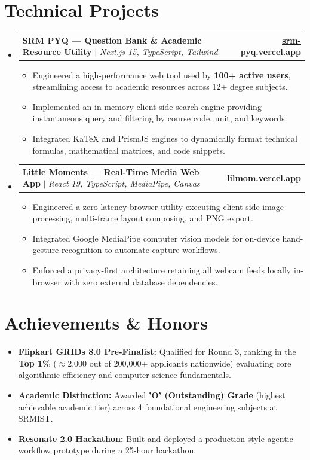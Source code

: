 \documentclass[letterpaper,10pt]{article}
\makeatletter
\newcommand{\resumeItem}[1]{
  \item\small{
    {#1 \vspace{-2pt}}
  }
}
\newcommand{\resumeProjectHeading}[2]{
    \item
    \begin{tabular*}{1.0\textwidth}[t]{l@{\extracolsep{\fill}}r}
      \small#1 & \textbf{\small #2}\\
    \end{tabular*}\vspace{-4pt}
}
\newcommand{\resumeSubHeadingListStart}{\begin{itemize}[leftmargin=0.0in, label={}]}
\newcommand{\resumeSubHeadingListEnd}{\end{itemize}}
\newcommand{\resumeItemListStart}{\begin{itemize}[leftmargin=0.15in, label=\raisebox{0.15ex}{\tiny$\bullet$}, itemsep=1.5pt]}
\newcommand{\resumeItemListEnd}{\end{itemize}\vspace{-3pt}}
\makeatother
\begin{document}
\section{Technical Projects}
    \resumeSubHeadingListStart
      \resumeProjectHeading
          {\textbf{SRM PYQ --- Question Bank \& Academic Resource Utility} $|$ \emph{Next.js 15, TypeScript, Tailwind}}{\href{https://srm-pyq.vercel.app/}{\underline{srm-pyq.vercel.app}}}
          \resumeItemListStart
            \resumeItem{Engineered a high-performance web tool used by \textbf{100+ active users}, streamlining access to academic resources across 12+ degree subjects.}
            \resumeItem{Implemented an in-memory client-side search engine providing instantaneous query and filtering by course code, unit, and keywords.}
            \resumeItem{Integrated KaTeX and PrismJS engines to dynamically format technical formulas, mathematical matrices, and code snippets.}
          \resumeItemListEnd

      \resumeProjectHeading
          {\textbf{Little Moments --- Real-Time Media Web App} $|$ \emph{React 19, TypeScript, MediaPipe, Canvas}}{\href{https://lilmom.vercel.app/}{\underline{lilmom.vercel.app}}}
          \resumeItemListStart
            \resumeItem{Engineered a zero-latency browser utility executing client-side image processing, multi-frame layout composing, and PNG export.}
            \resumeItem{Integrated Google MediaPipe computer vision models for on-device hand-gesture recognition to automate capture workflows.}
            \resumeItem{Enforced a privacy-first architecture retaining all webcam feeds locally in-browser with zero external database dependencies.}
          \resumeItemListEnd
    \resumeSubHeadingListEnd

\section{Achievements \& Honors}
    \resumeSubHeadingListStart
        \resumeItemListStart
            \resumeItem{\textbf{Flipkart GRIDs 8.0 Pre-Finalist:} Qualified for Round 3, ranking in the \textbf{Top 1\%} ($\approx$2,000 out of 200,000+ applicants nationwide) evaluating core algorithmic efficiency and computer science fundamentals.}
            \resumeItem{\textbf{Academic Distinction:} Awarded \textbf{'O' (Outstanding) Grade} (highest achievable academic tier) across 4 foundational engineering subjects at SRMIST.}
            \resumeItem{\textbf{Resonate 2.0 Hackathon:} Built and deployed a production-style agentic workflow prototype during a 25-hour hackathon.}
        \resumeItemListEnd
    \resumeSubHeadingListEnd
\end{document}
